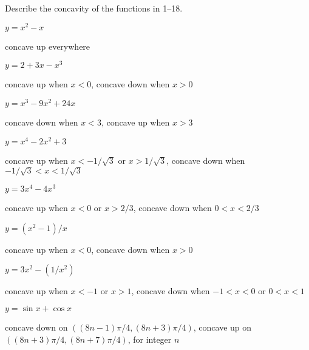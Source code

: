 \begin{exercises}
Describe the concavity of the functions in 1--18.

\twocol

\begin{exercise} $y=x^2-x$ 
\begin{answer} concave up everywhere
\end{answer}\end{exercise}

\begin{exercise} $y=2+3x-x^3$ 
\begin{answer} concave up when $x<0$, concave down when $x>0$
\end{answer}\end{exercise}

\begin{exercise} $y=x^3-9x^2+24x$
\begin{answer} concave down when $x<3$, concave up when $x>3$
\end{answer}\end{exercise}

\begin{exercise} $y=x^4-2x^2+3$ 
\begin{answer} concave up when $x<-1/\sqrt3$ or $x>1/\sqrt3$,
concave down when $-1/\sqrt3<x<1/\sqrt3$
\end{answer}\end{exercise}

\begin{exercise} $y=3x^4-4x^3$
\begin{answer} concave up when $x<0$ or $x>2/3$,
concave down when $0<x<2/3$
\end{answer}\end{exercise}

\begin{exercise} $y=(x^2-1)/x$
\begin{answer} concave up when $x<0$, concave down when $x>0$
\end{answer}\end{exercise}

\begin{exercise} $y=3x^2-(1/x^2)$ 
\begin{answer} concave up when $x<-1$ or $x>1$, concave down when
$-1<x<0$ or $0<x<1$
\end{answer}\end{exercise}

\begin{exercise} $y=\sin x + \cos x$ 
\begin{answer} concave down on $((8n-1)\pi/4,(8n+3)\pi/4)$,
concave up on $((8n+3)\pi/4,(8n+7)\pi/4)$, for integer $n$
\end{answer}\end{exercise}


\end{exercises}

